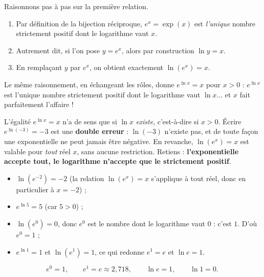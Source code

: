 \documentclass[11pt]{article}
\begin{document}
\begin{experience}
Raisonnons pas à pas sur la première relation.
\begin{enumerate}
\item Par définition de la bijection réciproque, $e^x = \exp(x)$ est \emph{l'unique} nombre strictement positif dont le logarithme vaut $x$.
\item Autrement dit, si l'on pose $y = e^x$, alors par construction $\ln y = x$.
\item En remplaçant $y$ par $e^x$, on obtient exactement $\ln(e^x) = x$.
\end{enumerate}
Le même raisonnement, en échangeant les rôles, donne $e^{\ln x} = x$ pour $x > 0$ : $e^{\ln x}$ est l'unique nombre strictement positif dont le logarithme vaut $\ln x$... et $x$ fait parfaitement l'affaire !
\end{experience}

\begin{attention}
L'égalité $e^{\ln x} = x$ n'a de sens que si $\ln x$ \emph{existe}, c'est-à-dire si $x > 0$. Écrire $e^{\ln(-3)} = -3$ est une \textbf{double erreur} : $\ln(-3)$ n'existe pas, et de toute façon une exponentielle ne peut jamais être négative. En revanche, $\ln(e^x) = x$ est valable pour \emph{tout} réel $x$, sans aucune restriction. Retiens : \textbf{l'exponentielle accepte tout, le logarithme n'accepte que le strictement positif}.
\end{attention}

\begin{exemplebox}
\begin{itemize}
\item $\ln\left(e^{-2}\right) = -2$ (la relation $\ln(e^x)=x$ s'applique à tout réel, donc en particulier à $x=-2$) ;
\item $e^{\ln 5} = 5$ (car $5 > 0$) ;
\item $\ln\left(e^{0}\right) = 0$, donc $e^0$ est le nombre dont le logarithme vaut $0$ : c'est $1$. D'où $e^0 = 1$ ;
\item $e^{\ln 1} = 1$ et $\ln(e^1) = 1$, ce qui redonne $e^1 = e$ et $\ln e = 1$.
\end{itemize}
\end{exemplebox}

\begin{aretenir}
\[ e^0 = 1, \qquad e^1 = e \approx 2,718, \qquad \ln e = 1, \qquad \ln 1 = 0. \]
\end{aretenir}
\end{document}
